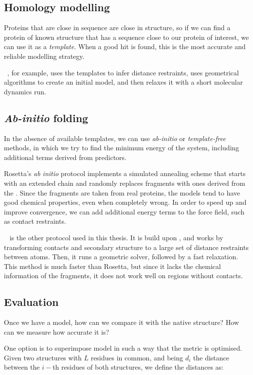 \subsection{Homology modelling}
Proteins that are close in sequence are close in structure, so if we can find a protein of known structure that has a sequence close to our protein of interest, we can use it as a \emph{template}.
When a good hit is found, this is the most accurate and reliable modelling strategy.

\MODELLER~\citep{modeller}, for example, uses the templates to infer distance restraints, uses geometrical algorithms to create an initial model, and then relaxes it with a short molecular dynamics run.


\subsection{\emph{Ab-initio} folding}
In the absence of available templates, we can use \emph{ab-initio} or \emph{template-free} methods, in which we try to find the minimum energy of the system, including additional terms derived from predictors.

Rosetta's \citep{Rosetta3}  \emph{ab initio} protocol implements a simulated annealing scheme that starts with an extended chain and randomly replaces fragments with ones derived from the \PDB.
Since the fragments are taken from real proteins, the models tend to have good chemical properties, even when completely wrong.
In order to speed up and improve convergence, we can add additional energy terms to the force field, such as contact restraints.

\CONFOLD~\citep{confold} \marginpar{\CONFOLD} is the other protocol used in this thesis.
It is build upon \CNS, and works by transforming contacts and secondary structure to a large set of distance restraints between atoms.
Then, it runs a geometric solver, followed by a fast relaxation.
This method is much faster than Rosetta, but since it lacks the chemical information of the fragments, it does not work well on regions without contacts.


\subsection{Evaluation}
Once we have a model, how can we compare it with the native structure? How can we measure how accurate it is?

One option is to superimpose model 
in such a way that the metric is optimised.
Given two structures with $L$ residues in common, and being $d_i$ the distance between the $i-$th residues of both structures, we define the distances as:

